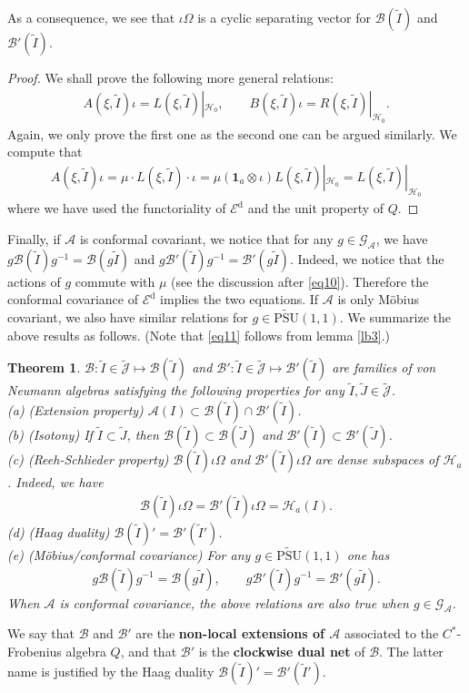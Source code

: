 \documentclass[12pt,a4paper]{article}
\theoremstyle{definition}
\theoremstyle{plain}
\newtheorem{thm}[df]{Theorem}
\newcommand{\mc}{\mathcal}
\newcommand{\wtd}{\widetilde}
\newcommand{\id}{\mathbf{1}}
\newcommand{\UPSU}{\widetilde{\mathrm{PSU}}(1,1)}
\newcommand{\GA}{\mathscr G_{\mathcal A}}
\newcommand{\Jtd}{\widetilde{\mathcal J}}
\newcommand{\Ed}{\mathscr E^{\mathrm d}}
\numberwithin{equation}{section}
\begin{document}
As a consequence, we see that $\iota\Omega$ is a cyclic separating vector for $\mc B(\wtd I)$ and $\mc B'(\wtd I)$.
\begin{proof}
We shall prove the following more general relations:
\begin{align}
A(\xi,\wtd I)\iota=L(\xi,\wtd I)|_{\mc H_0},\qquad B(\xi,\wtd I)\iota=R(\xi,\wtd I)|_{\mc H_0}.
\end{align}
Again, we only prove the first one as the second one can be argued similarly. We compute that
\begin{align*}
A(\xi,\wtd I)\iota=\mu\cdot L(\xi,\wtd I)\cdot\iota=\mu(\id_a\otimes\iota)L(\xi,\wtd I)|_{\mc H_0}=L(\xi,\wtd I)|_{\mc H_0}
\end{align*}
where we have used the functoriality of $\Ed$ and the unit property of $Q$.
\end{proof}

Finally, if $\mc A$ is conformal covariant, we notice that for any $g\in\GA$, we have $g\mc B(\wtd I)g^{-1}=\mc B(g\wtd I)$ and $g\mc B'(\wtd I)g^{-1}=\mc B'(g\wtd I)$. Indeed, we notice that the actions of $g$ commute with $\mu$ (see the discussion after \eqref{eq10}). Therefore the conformal covariance of $\Ed$ implies the two equations. If $\mc A$ is only M\"obius covariant, we also have similar relations for $g\in\UPSU$. We summarize the above results as follows. (Note that \eqref{eq11} follows from lemma \ref{lb3}.)

\begin{thm}\label{lb10}
$\mc B:\wtd I\in\Jtd\mapsto \mc B(\wtd I)$ and $\mc B':\wtd I\in\Jtd\mapsto \mc B'(\wtd I)$ are families of von Neumann algebras satisfying the following properties for any $\wtd I,\wtd J\in\Jtd$.\\
(a) (Extension property)  $\mc A(I)\subset\mc B(\wtd I)\cap\mc B'(\wtd I)$.\\
(b) (Isotony) If $\wtd I\subset\wtd J$, then $\mc B(\wtd I)\subset\mc B(\wtd J)$ and $\mc B'(\wtd I)\subset\mc B'(\wtd J)$.\\
(c) (Reeh-Schlieder property) $\mc B(\wtd I)\iota\Omega$ and $\mc B'(\wtd I)\iota\Omega$ are dense subspaces of $\mc H_a$. Indeed, we have
\begin{align}
\mc B(\wtd I)\iota\Omega=\mc B'(\wtd I)\iota\Omega=\mc H_a(I).\label{eq11}
\end{align}
(d) (Haag duality) $\mc B(\wtd I)'=\mc B'(\wtd I')$.\\
(e) (M\"obius/conformal covariance) For any $g\in\UPSU$ one has
\begin{align}
g\mc B(\wtd I)g^{-1}=\mc B(g\wtd I),\qquad g\mc B'(\wtd I)g^{-1}=\mc B'(g\wtd I).
\end{align}
When $\mc A$ is conformal covariance, the above relations are also true when $g\in\GA$.
\end{thm}
We say that $\mc B$ and $\mc B'$ are the \textbf{non-local extensions of $\mc A$} associated to the $C^*$-Frobenius algebra $Q$, and that $\mc B'$ is the \textbf{clockwise dual net} of $\mc B$. The latter name is justified by the Haag duality $\mc B(\wtd I)'=\mc B'(\wtd I')$.
\end{document}
